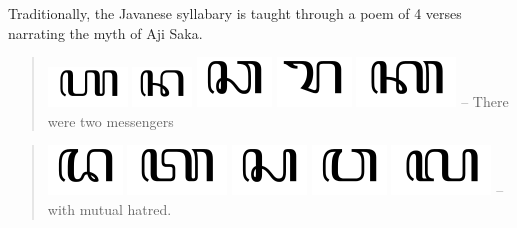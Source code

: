 \documentclass[a4paper,12pt]{book}
\begin{document}
Traditionally, the Javanese syllabary
is taught through a poem of 4 verses
narrating the myth of Aji Saka.
\begin{quote}
\includegraphics[scale=0.3]{figs/ha.png}
\includegraphics[scale=0.3]{figs/na.png}
\includegraphics[scale=0.3]{figs/ca.png}
\includegraphics[scale=0.3]{figs/ra.png}
\includegraphics[scale=0.3]{figs/ka.png} --
There were two messengers
\end{quote}
\begin{quote}
\includegraphics[scale=0.3]{figs/da.png}
\includegraphics[scale=0.3]{figs/ta.png}
\includegraphics[scale=0.3]{figs/sa.png}
\includegraphics[scale=0.3]{figs/wa.png}
\includegraphics[scale=0.3]{figs/la.png} --
with mutual hatred.
\end{quote}
\end{document}
